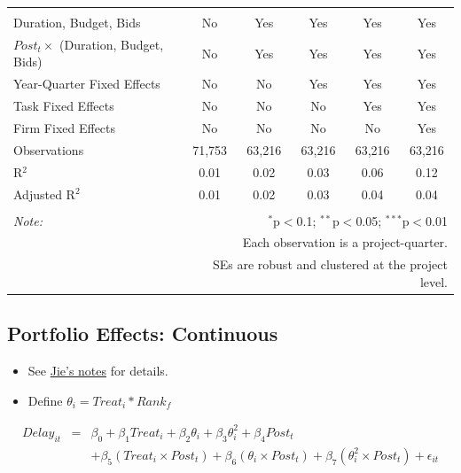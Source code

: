 \documentclass[
]{article}
\providecommand{\tightlist}{%
  \setlength{\itemsep}{0pt}\setlength{\parskip}{0pt}}
\begin{document}
\begin{table}[H]
\begin{tabular}{@{\extracolsep{-2pt}}lccccc}
  & & & & & \\ 
\hline \\[-1.8ex] 
Duration, Budget, Bids & No & Yes & Yes & Yes & Yes \\ 
$Post_t \times$  (Duration, Budget, Bids) & No & Yes & Yes & Yes & Yes \\ 
Year-Quarter Fixed Effects & No & No & Yes & Yes & Yes \\ 
Task Fixed Effects & No & No & No & Yes & Yes \\ 
Firm Fixed Effects & No & No & No & No & Yes \\ 
Observations & 71,753 & 63,216 & 63,216 & 63,216 & 63,216 \\ 
R$^{2}$ & 0.01 & 0.02 & 0.03 & 0.06 & 0.12 \\ 
Adjusted R$^{2}$ & 0.01 & 0.02 & 0.03 & 0.04 & 0.04 \\ 
\hline 
\hline \\[-1.8ex] 
\textit{Note:}  & \multicolumn{5}{r}{$^{*}$p$<$0.1; $^{**}$p$<$0.05; $^{***}$p$<$0.01} \\ 
 & \multicolumn{5}{r}{Each observation is a project-quarter.} \\ 
 & \multicolumn{5}{r}{SEs are robust and clustered at the project level.} \\ 
\end{tabular} 
\end{table}

\hypertarget{portfolio-effects-continuous}{%
\subsection{Portfolio Effects:
Continuous}\label{portfolio-effects-continuous}}

\begin{itemize}
\tightlist
\item
  See
  \href{https://github.com/QuickPay-Operational-Performance/Data-and-code/blob/master/notes/Portfolio\%20model\%2B0308.pdf}{Jie's
  notes} for details.
\item
  Define \(\theta_i = Treat_i*Rank_f\)
\end{itemize}

\[ \begin{aligned} Delay_{it} &=& \beta_0+\beta_1 Treat_i + \beta_2 \theta_i+\beta_3 \theta_i^2+\beta_4 Post_t\\&& + \beta_5 (Treat_i\times Post_t) + \beta_6 (\theta_i\times Post_t) +\beta_7 (\theta_i^2\times Post_t)+\epsilon_{it} \end{aligned} \]
\end{document}
